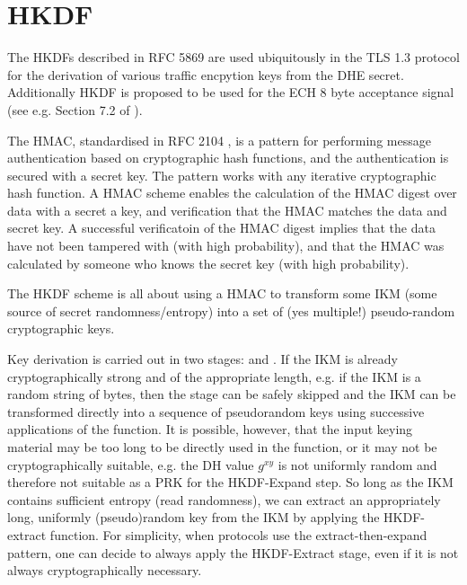 
\section{HKDF}

The \acp{HKDF} described in RFC 5869 \citep{rfc5869hkdf} are used ubiquitously in the \ac{TLS} 1.3 protocol for the derivation of various traffic encpytion keys from the \ac{DHE} secret.
Additionally \ac{HKDF} is proposed to be used for the \ac{ECH}  8 byte acceptance signal (see e.g. Section 7.2 of \cite{esni}).

The \ac{HMAC}, standardised in RFC 2104  \citep{rfc2104}, is a pattern for performing message authentication based on cryptographic hash functions, and the authentication is secured with a secret key. The pattern works with any iterative cryptographic hash function. %
A \ac{HMAC} scheme enables the calculation of the \ac{HMAC} digest over data with a secret a key, and verification that the \ac{HMAC} matches the data and secret key.
A successful verificatoin of the \ac{HMAC} digest
implies that the data have not been tampered with (with high probability),
and that the \ac{HMAC} was calculated by someone who knows the secret key (with high probability).

The \ac{HKDF} scheme is all about using a \ac{HMAC} to transform some \ac{IKM} (some source of secret randomness/entropy)
into a set of (yes multiple!) pseudo-random cryptographic keys.

Key derivation is carried out in two stages:  and .
If the \ac{IKM} is already cryptographically strong and of the appropriate length, e.g. if the \ac{IKM} is a random string of  bytes,
then the  stage can be safely skipped and the \ac{IKM}
can be transformed
directly into a sequence of pseudorandom keys using successive applications of the  function.
It is possible, however, that the input keying material may be too long to be directly used in the  function, or it may not be cryptographically suitable, e.g. the \ac{DH} value $g^{xy}$ is not uniformly random and therefore not suitable as a PRK for the HKDF-Expand step.
So long as the \ac{IKM} contains sufficient entropy (read randomness), we can extract an appropriately long, uniformly (pseudo)random key from the \ac{IKM} by applying the HKDF-extract function.
For simplicity, when protocols use the extract-then-expand pattern, one can decide to always apply the HKDF-Extract stage, even if it is not always cryptographically necessary.

